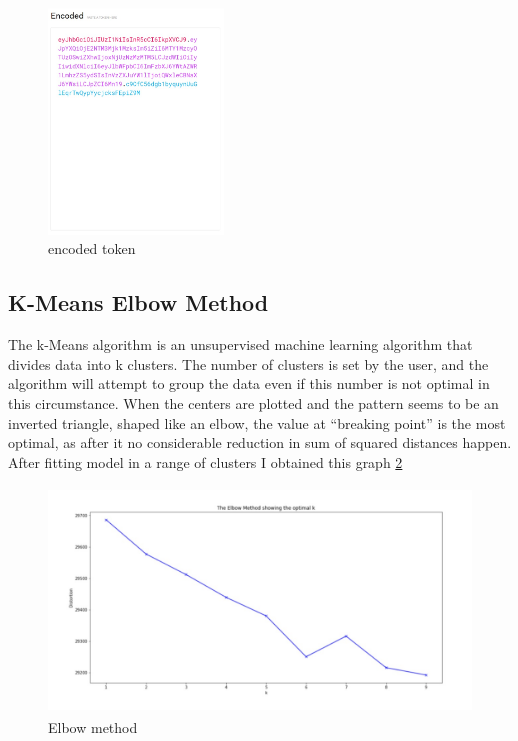 \documentclass[twoside,twocolumn]{article}
\begin{document}
\begin{figure}[h]
\includegraphics[width=1\linewidth, height=6cm]{images/encoded.jpg}
\caption{encoded token}
\label{fig:enc}
\end{figure}

\subsection{K-Means Elbow Method}

The k-Means algorithm is an unsupervised machine learning algorithm that divides
data into k clusters. The number of clusters is set by the user, and the algorithm
will attempt to group the data even if this number is not optimal in this
circumstance.
When the centers are plotted and the pattern seems to be an inverted triangle,
shaped like an elbow, the value at “breaking point” is the most optimal, as after it
no considerable reduction in sum of squared distances happen. After fitting model
in a range of clusters I obtained this graph \ref{fig:elb}


\begin{figure}[h]
\includegraphics[width=1\linewidth, height=6cm]{images/elbow_method.jpg}
\caption{Elbow method}
\label{fig:elb}
\end{figure}

\end{document}
